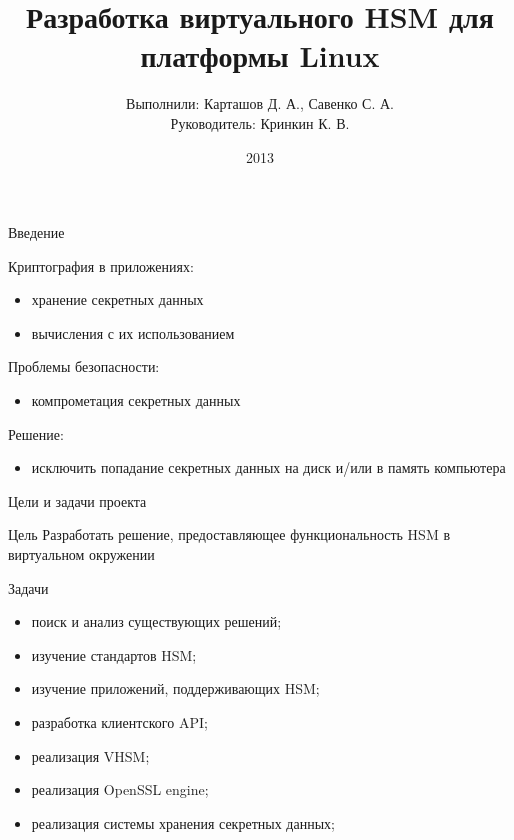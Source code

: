 \documentclass[utf8, 11pt]{beamer}
\author[ ]{Выполнили: Карташов Д. А., Савенко С. А. \\ Руководитель: Кринкин К. В.}
\title[Virtual HSM]{Разработка виртуального HSM для платформы Linux}
\institute[СПбАУ]
{
  Кафедра математических и информационных технологий\\
  Санкт-Петербургский Академический университет
}
\date{ 2013 }
\begin{document}
\begin{frame}
  \titlepage
\end{frame}

\begin{frame}{Введение}

Криптография в приложениях:
\begin{itemize}
\item хранение секретных данных
\item вычисления с их использованием
\end{itemize}

\vspace*{\fill}

Проблемы безопасности:
\begin{itemize}
\item компрометация секретных данных
\end{itemize}

\vspace*{\fill}

Решение:
\begin{itemize}
\item исключить попадание секретных данных на диск и/или в память компьютера
\end{itemize}

\vspace*{\fill}

\end{frame}

\begin{frame}{Цели и задачи проекта}

\begin{block}{Цель}
Разработать решение, предоставляющее функциональность HSM в виртуальном окружении
\end{block}

\vspace*{\fill}

\begin{block}{Задачи}
\begin{itemize}
\item поиск и анализ существующих решений;
\item изучение стандартов HSM;
\item изучение приложений, поддерживающих HSM;
\item разработка клиентского API;
\item реализация VHSM;
\item реализация OpenSSL engine;
\item реализация системы хранения секретных данных;
\end{itemize}
\end{block}

\end{frame}
\end{document}
